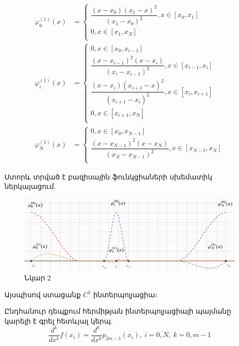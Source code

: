 \documentclass[fleqn, bachelor,subf,12pt,notitlepage]{disser}
\begin{document}
\begin{align*}
\varphi^{(1)}_{0}\left(x\right)&=\begin{cases}
\dfrac{\left(x-x_{0}\right)\left(x_{1}-x\right)^{2}}{\left(x_{1}-x_{0}\right)^{2}}, x\in \left[x_{0}, x_{1}\right]\\
0, x\in \left[x_{1}, x_{N}\right]\\
\end{cases}\\
\varphi^{(1)}_{i}\left(x\right)&=\begin{cases}
0, x\in \left[x_{0}, x_{i-1}\right]\\
\dfrac{\left(x-x_{i-1}\right)^2\left(x-x_{i}\right)}{\left(x_{i}-x_{i-1}\right)^{2}}, x\in \left[x_{i-1}, x_{i}\right]\\
\dfrac{\left(x-x_{i}\right)\left(x_{i+1}-x\right)^{2}}{\left(x_{i+1}-x_{i}\right)^{2}}, x\in \left[x_{i}, x_{i+1}\right]\\
0, x\in \left[x_{i+1}, x_{N}\right]\\
\end{cases}\\
\varphi^{(1)}_{N}\left(x\right)&=\begin{cases}
0, x\in \left[x_{0}, x_{N-1}\right]\\
\dfrac{\left(x-x_{N-1}\right)^{2}\left(x-x_{N}\right)}{\left(x_{N}-x_{N-1}\right)^{2}}, x\in \left[x_{N-1}, x_{N}\right]\\
\end{cases}
\end{align*}

Ստորև տրված է բազիսային ֆունկցիաների սխեմատիկ ներկայացում.
\begin{figure}[h!]
\centering
\includegraphics[width=1.0\textwidth]{images/image_2}
\captionsetup{labelformat=empty}
\caption{\hfill Նկար 2}
\end{figure}

Այսպիսով ստացանք $C^{1}$ ինտերպոլյացիա։

Ընդհանուր դեպքում հերմիթյան ինտերպոլյացիայի պայմանը կարելի է գրել հետևյալ կերպ.
$$\dfrac{d^{k}}{dx^{k}}f\left(x_{i}\right)=\dfrac{d^{k}}{dx^{k}}p_{2m-1}\left(x_{i}\right), \;  i=\overline{0, N}, \;  k=\overline{0, m-1}$$
\end{document}
